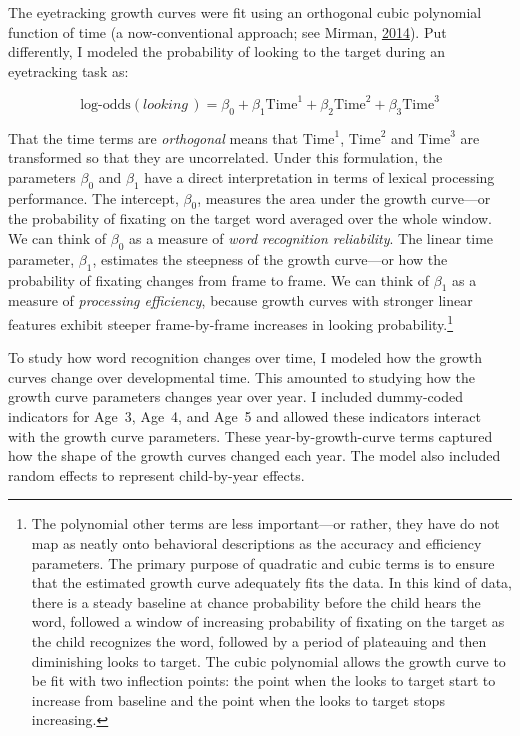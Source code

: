 \documentclass [11pt, proquest] {uwthesis}[2015/03/03]
\begin{document}
The eyetracking growth curves were fit using an orthogonal cubic
polynomial function of time (a now-conventional approach; see Mirman,
\protect\hyperlink{ref-Mirman2014}{2014}). Put differently, I modeled
the probability of looking to the target during an eyetracking task as:

\[
\text{log-odds}(\textit{looking}\,) = 
  \beta_0 + 
  \beta_1\text{Time}^1 + 
  \beta_2\text{Time}^2 + 
  \beta_3\text{Time}^3
\]

That the time terms are \emph{orthogonal} means that \(\text{Time}^1\),
\(\text{Time}^2\) and \(\text{Time}^3\) are transformed so that they are
uncorrelated. Under this formulation, the parameters \(\beta_0\) and
\(\beta_1\) have a direct interpretation in terms of lexical processing
performance. The intercept, \(\beta_0\), measures the area under the
growth curve---or the probability of fixating on the target word
averaged over the whole window. We can think of \(\beta_0\) as a measure
of \emph{word recognition reliability}. The linear time parameter,
\(\beta_1\), estimates the steepness of the growth curve---or how the
probability of fixating changes from frame to frame. We can think of
\(\beta_1\) as a measure of \emph{processing efficiency}, because growth
curves with stronger linear features exhibit steeper frame-by-frame
increases in looking probability.\footnote{The polynomial other terms
  are less important---or rather, they have do not map as neatly onto
  behavioral descriptions as the accuracy and efficiency parameters. The
  primary purpose of quadratic and cubic terms is to ensure that the
  estimated growth curve adequately fits the data. In this kind of data,
  there is a steady baseline at chance probability before the child
  hears the word, followed a window of increasing probability of
  fixating on the target as the child recognizes the word, followed by a
  period of plateauing and then diminishing looks to target. The cubic
  polynomial allows the growth curve to be fit with two inflection
  points: the point when the looks to target start to increase from
  baseline and the point when the looks to target stops increasing.}

To study how word recognition changes over time, I modeled how the
growth curves change over developmental time. This amounted to studying
how the growth curve parameters changes year over year. I included
dummy-coded indicators for Age~3, Age~4, and Age~5 and allowed these
indicators interact with the growth curve parameters. These
year-by-growth-curve terms captured how the shape of the growth curves
changed each year. The model also included random effects to represent
child-by-year effects.
\end{document}
